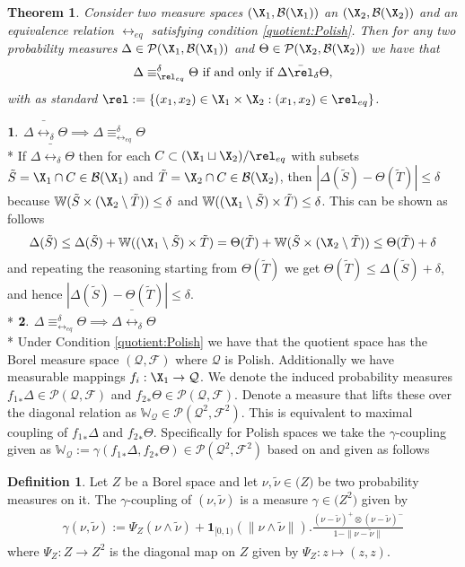 \documentclass[letterpaper, 10 pt, conference]{amsart}
\newtheorem{theorem}{Theorem}
\theoremstyle{definition}
\newtheorem{definition}{Definition}
\theoremstyle{example}
\theoremstyle{remark}
\begin{document}
\begin{theorem}\label{thm:equivlifting}
Consider two measure spaces $(\X_1,\mathcal B (\X_1))$ an $(\X_2,\mathcal B(\X_2))$ and an equivalence relation $\rel_{eq}$ satisfying condition \ref{quotient:Polish}. 
Then for any two probability measures $\Delta\in\mathcal{P}(\X_1,\mathcal B (\X_1))$ and  $\Theta\in\mathcal{P}(\X_2,\mathcal B (\X_2))$ we have that 
\[\Delta\equiv^\delta_{\rel_{eq}} \Theta\textmd{ if and only if } \Delta\bar \rel_{\delta} \Theta, \]
with as standard $\rel:=\{(x_1,x_2)\in \X_1\times \X_2: (x_1,x_2)\in\rel_{eq} \}$.  
\end{theorem}
 \proof
 \noindent$\bf1.$
 $\Delta\bar \rel_{\delta} \Theta
\implies  \Delta\equiv^\delta_{\rel_{eq}} \Theta$\\*
 If  $\Delta \bar\rel_\delta \Theta$ then for each  $C\subset (\X_1\sqcup \X_2)/\rel_{eq}$ with subsets $\tilde S=\X_1\cap C\in \mathcal{B}(\X_1)$ and $\tilde T=\X_2\cap C\in \mathcal{B}(\X_2)$, then $|\Delta(\tilde S)-\Theta(\tilde T)|\leq \delta$ because
\(\mathbb
W(\tilde S\times (\X_2\setminus \tilde T))\leq \delta 
\)
and 
\(\mathbb W((\X_1\setminus \tilde S)\times \tilde T)\leq \delta\). This can be shown as follows 
\[ \Delta(\tilde S)\leq \Delta(\tilde S)+\mathbb W((\X_1\setminus \tilde S)\times\tilde T)=\Theta(\tilde T)+\mathbb W(\tilde S\times (\X_2\setminus \tilde T))\leq \Theta(\tilde T)+\delta \]
and repeating the reasoning starting from $\Theta(\tilde T)$ we get $\Theta(\tilde T)\leq \Delta(\tilde S)+\delta$, and hence $|\Delta(\tilde S)-\Theta(\tilde T)|\leq \delta$.\\*
\noindent$\bf2.$
 $\Delta\equiv^\delta_{\rel_{eq}} \Theta\implies \Delta\bar \rel_{\delta} \Theta$\\*
 Under Condition \ref{quotient:Polish} we have that the quotient space has the Borel measure space $(\mathcal Q, \mathcal F)$ where $\mathcal Q$ is Polish.
Additionally we have measurable mappings $f_i:\X_1\rightarrow \mathcal Q$. We denote the induced probability measures ${f_1}_\ast \Delta\in \mathcal P(\mathcal Q, \mathcal F)$ and ${f_2}_\ast \Theta\in \mathcal P(\mathcal Q, \mathcal F)$. 
Denote a measure that lifts these over the diagonal relation as $\mathbb W_{\mathcal Q}\in\mathcal P(\mathcal Q^2 , \mathcal F^2) $. This is equivalent to maximal coupling of ${f_1}_\ast \Delta$ and ${f_2}_\ast \Theta$. Specifically for Polish spaces we  take the $\gamma$-coupling given as $\mathbb W_{\mathcal Q} := \gamma({f_1}_\ast \Delta,{f_2}_\ast \Theta) \in\mathcal P(\mathcal Q^2 , \mathcal F^2)$ 
\cite{art2014}
based on \cite[Section 1.5]{lindvall2002lectures} and given as follows\begin{definition}
Let $Z$ be a Borel space and let $\nu, \tilde\nu \in\mathcal(Z)$ be two probability measures on it. The $\gamma$-coupling of $(\nu, \tilde\nu)$ is a measure $\gamma\in\mathcal(Z^2)$ given by
\begin{align*}
\gamma(\nu, \tilde\nu):=\Psi_Z(\nu\wedge \tilde\nu)+\mathbf{1}_{[0,1)} (\|\nu\wedge \tilde\nu\|).\frac{(\nu- \tilde\nu)^+\otimes(\nu- \tilde\nu)^-}{1-\|\nu-\tilde\nu\|}
\end{align*}
where $\Psi_Z:Z\rightarrow Z^2$ is the diagonal map on $Z$ given by $\Psi_Z:z \mapsto (z,z)$.
\end{definition} 
\end{document}
